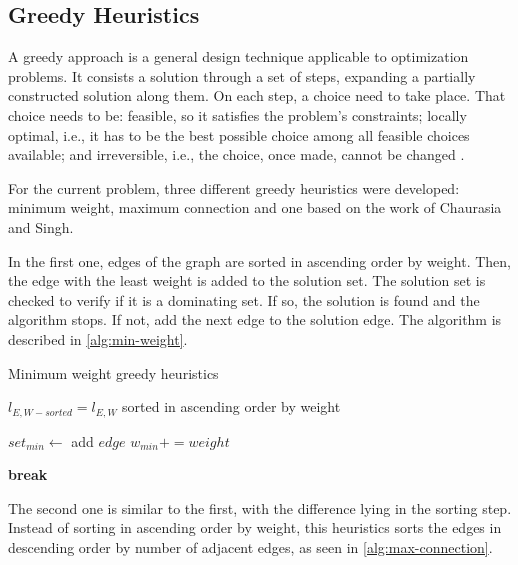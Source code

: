 \subsection{Greedy Heuristics}
A greedy approach is a general design technique applicable to optimization problems.
It consists a solution through a set of steps, expanding a partially constructed solution along them.
On each step, a choice need to take place.
That choice needs to be: feasible, so it satisfies the problem's constraints; locally optimal, i.e., it has to be the best possible choice among all feasible choices available; and irreversible, i.e., the choice, once made, cannot be changed \cite{levitin2012introduction}.

For the current problem, three different greedy heuristics were developed: minimum weight, maximum connection and one based on the work of Chaurasia and Singh\cite{chaurasia}.

In the first one, edges of the graph are sorted in ascending order by weight. 
Then, the edge with the least weight is added to the solution set.
The solution set is checked to verify if it is a dominating set.
If so, the solution is found and the algorithm stops.
If not, add the next edge to the solution edge.
The algorithm is described in \autoref{alg:min-weight}. 

\begin{algorithm}
\caption{Minimum weight greedy heuristics}
\label{alg:min-weight}
\begin{algorithmic}


\State $l_{E,W-sorted} = l_{E,W}$ sorted in ascending order by weight

    \State $set_{min} \gets$ add $edge$
    \State $w_{min} += weight$

        \State \textbf{break}
    \EndIf
\EndFor
\end{algorithmic}
\end{algorithm}

The second one is similar to the first, with the difference lying in the sorting step.
Instead of sorting in ascending order by weight, this heuristics sorts the edges in descending order by number of adjacent edges, as seen in \autoref{alg:max-connection}.

